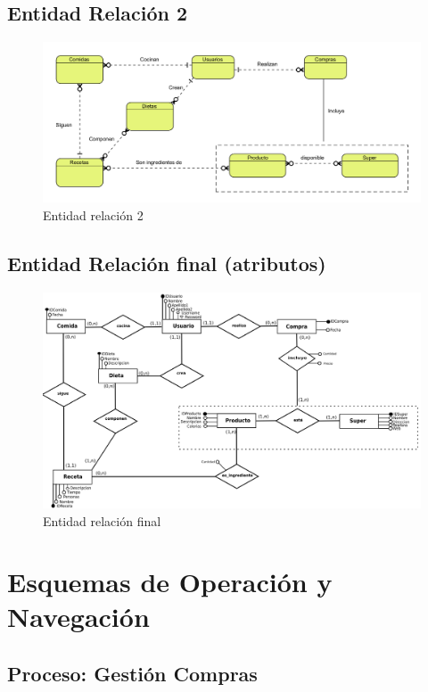 \documentclass[a4paper,12pt]{report}
\begin{document}
\section{Entidad Relación 2}
\label{sec-6-3}
\begin{figure}[!htp]
\centering
\includegraphics[width=0.9\linewidth]{./refinamientos/er2.png}
\caption{Entidad relación 2}
\label{fig:Entidad relación 2}
\medskip
\footnotesize
{}
\end{figure}
\section{Entidad Relación final (atributos)}
\label{sec-6-4}
\begin{figure}[!htp]
\centering
\includegraphics[width=1\linewidth]{./refinamientos/erfinal.png}
\caption{Entidad relación final}
\label{fig:Entidad relación final}
\medskip
\footnotesize
{}
\end{figure}
\chapter{Esquemas de Operación y Navegación}
\label{sec-7}
\section{Proceso: Gestión Compras}
\label{sec-7-1}
\end{document}
